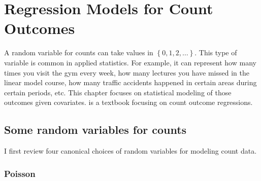  
\chapter{Regression Models for Count Outcomes}
\label{chapter::count}
 
A random variable for counts can take values in $\left\{ 0,1,2,\ldots\right\} $. This type of variable is common in applied statistics. For example, it can represent how many times you visit the gym every week, how many lectures you have missed in the linear model course, how many traffic accidents happened in certain areas during certain periods, etc. This chapter focuses on statistical modeling of those outcomes given covariates. \citet{hilbe2014modeling} is a textbook focusing on count outcome regressions. 




\section{Some random variables for counts\label{sec:Some-random-variables-counts}}


I first review four canonical choices of random variables for modeling count data.

\subsection{Poisson}

